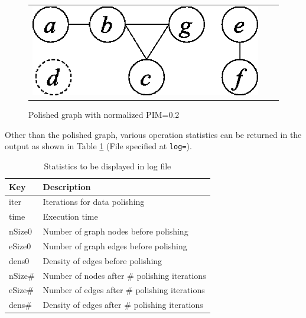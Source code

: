 \begin{figure}[htbp]
\begin{center}
\begin{tabular}{ccc}
\begin{minipage}{0.3\hsize}
\begin{center}
\includegraphics[scale=0.5]{./pmi02.eps}
\caption{Polished graph with normalized PIM=0.2\label{fig:pmi02}}
\end{center}
\end{minipage}

\end{tabular}
\end{center}
\end{figure}

Other than the polished graph, various operation statistics can be returned in the output as shown in Table \ref{tbl:stat} (File specified at \verb|log=|).

\begin{table}[htbp]
\begin{center}
\caption{Statistics to be displayed in log file\label{tbl:stat}}
\begin{tabular}{ll}
\hline
Key & Description \\
\hline
iter & Iterations for data polishing  \\
time & Execution time\\
nSize0 & Number of graph nodes before polishing \\
eSize0 & Number of graph edges before polishing \\
dens0  & Density of edges before polishing  \\
nSize\# & Number of nodes after \# polishing iterations \\
eSize\# & Number of edges after \# polishing iterations \\
dens\#  & Density of edges after \# polishing iterations \\

\hline
\end{tabular} 
\end{center}
\end{table}


